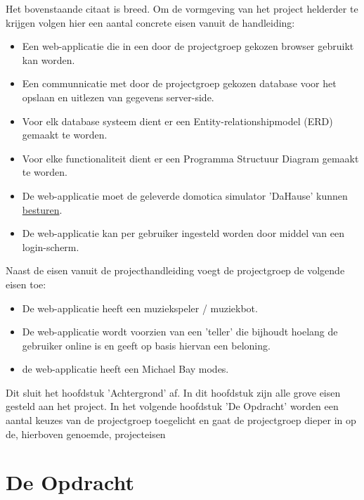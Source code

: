 \documentclass[11pt]{article}
\begin{document}
\begin{flushleft}
	Het bovenstaande citaat is breed. Om de vormgeving van het project helderder te krijgen volgen hier een aantal concrete eisen vanuit de handleiding: 
	\begin{itemize}
		\item Een web-applicatie die in een door de projectgroep gekozen browser gebruikt kan worden.
		\item Een communnicatie met door de projectgroep gekozen database voor het opslaan en uitlezen van gegevens server-side.
		\item Voor elk database systeem dient er een Entity-relationshipmodel (ERD) gemaakt te worden. 
		\item Voor elke functionaliteit dient er een Programma Structuur Diagram gemaakt te worden.
		\item De web-applicatie moet de geleverde domotica simulator 'DaHause' kunnen \underline{besturen}.
		\item De web-applicatie kan per gebruiker ingesteld worden door middel van een login-scherm.  
	\end{itemize}
	\newpage
	Naast de eisen vanuit de projecthandleiding voegt de projectgroep de volgende eisen toe:
	\begin{itemize}
		\item De web-applicatie heeft een muziekspeler / muziekbot.
		\item De web-applicatie wordt voorzien van een 'teller' die bijhoudt hoelang de gebruiker online is en geeft op basis hiervan een beloning.
		\item de web-applicatie heeft een Michael Bay modes.
	\end{itemize}
\end{flushleft}

\begin{flushleft}
	Dit sluit het hoofdstuk 'Achtergrond' af. In dit hoofdstuk zijn alle grove eisen gesteld aan het project. In het volgende hoofdstuk 'De Opdracht' worden
	een aantal keuzes van de projectgroep toegelicht en gaat de projectgroep dieper in op de, hierboven genoemde, projecteisen
\end{flushleft}
\newpage


	\section{De Opdracht}
\end{document}
